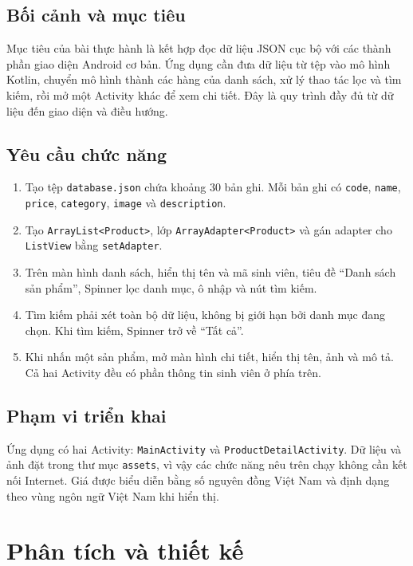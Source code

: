 \documentclass[12pt,a4paper]{article}
\newcommand{\codepath}[1]{\nolinkurl{#1}}
\begin{document}
\subsection{Bối cảnh và mục tiêu}
Mục tiêu của bài thực hành là kết hợp đọc dữ liệu JSON cục bộ với các thành phần giao diện
Android cơ bản. Ứng dụng cần đưa dữ liệu từ tệp vào mô hình Kotlin, chuyển mô hình thành
các hàng của danh sách, xử lý thao tác lọc và tìm kiếm, rồi mở một Activity khác để xem chi tiết.
Đây là quy trình đầy đủ từ dữ liệu đến giao diện và điều hướng.

\subsection{Yêu cầu chức năng}
\begin{enumerate}
\item Tạo tệp \codepath{database.json} chứa khoảng 30 bản ghi. Mỗi bản ghi có
\texttt{code}, \texttt{name}, \texttt{price}, \texttt{category}, \texttt{image}
và \texttt{description}.
\item Tạo \texttt{ArrayList<Product>}, lớp \texttt{ArrayAdapter<Product>} và
gán adapter cho \texttt{ListView} bằng \texttt{setAdapter}.
\item Trên màn hình danh sách, hiển thị tên và mã sinh viên, tiêu đề
“Danh sách sản phẩm”, Spinner lọc danh mục, ô nhập và nút tìm kiếm.
\item Tìm kiếm phải xét toàn bộ dữ liệu, không bị giới hạn bởi danh mục đang chọn.
Khi tìm kiếm, Spinner trở về “Tất cả”.
\item Khi nhấn một sản phẩm, mở màn hình chi tiết, hiển thị tên, ảnh và mô tả.
Cả hai Activity đều có phần thông tin sinh viên ở phía trên.
\end{enumerate}

\subsection{Phạm vi triển khai}
Ứng dụng có hai Activity: \texttt{MainActivity} và \texttt{ProductDetailActivity}.
Dữ liệu và ảnh đặt trong thư mục \texttt{assets}, vì vậy các chức năng nêu trên chạy
không cần kết nối Internet. Giá được biểu diễn bằng số nguyên đồng Việt Nam và định dạng
theo vùng ngôn ngữ Việt Nam khi hiển thị.

\section{Phân tích và thiết kế}
\end{document}
